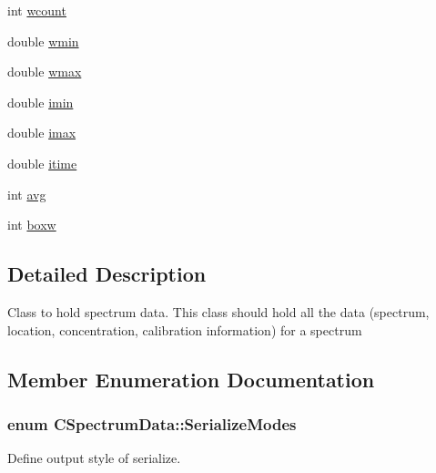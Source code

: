 \begin{DoxyCompactItemize}
int \hyperlink{classCSpectrumData_a4ad75480bbfcc126e5c33c47021cc393}{wcount}
\item 
double \hyperlink{classCSpectrumData_ae983387d5ee053605067fcd9c6de834d}{wmin}
\item 
double \hyperlink{classCSpectrumData_a6f3d5bafa576e363c7cee48c2fd2612f}{wmax}
\item 
double \hyperlink{classCSpectrumData_a3d8c558ec07ad4a7bb1f713810b823c1}{imin}
\item 
double \hyperlink{classCSpectrumData_a00501108e9e51562df5bbe3fefdcd929}{imax}
\item 
double \hyperlink{classCSpectrumData_a925dd53b846689dfbb4dfc45d259c7e9}{itime}
\item 
int \hyperlink{classCSpectrumData_af150a81336f7f2b38f273b9afbaed5c3}{avg}
\item 
int \hyperlink{classCSpectrumData_a77d71cf442dabd538a5d8cbdc0c8ab5e}{boxw}
\end{DoxyCompactItemize}


\subsection{Detailed Description}
Class to hold spectrum data. This class should hold all the data (spectrum, location, concentration, calibration information) for a spectrum 

\subsection{Member Enumeration Documentation}
\hypertarget{classCSpectrumData_aa387f7d2542863db15d57173f83fa359}{
\subsubsection[{SerializeModes}]{\setlength{\rightskip}{0pt plus 5cm}enum {\bf CSpectrumData::SerializeModes}}}
\label{classCSpectrumData_aa387f7d2542863db15d57173f83fa359}


Define output style of serialize. 

